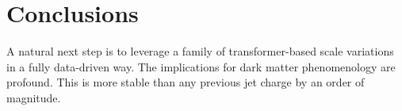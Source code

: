 \section{Conclusions}\label{sec:conclusions}

A natural next step is to leverage a family of transformer-based scale
variations in a fully data-driven way. The implications for dark matter
phenomenology are profound. This is more stable than any previous jet
charge by an order of magnitude.

